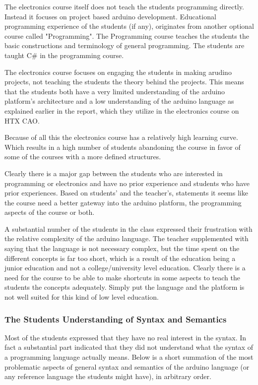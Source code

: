 The electronics course itself does not teach the students programming directly. 
Instead it focuses on project based arduino development. 
Educational programming experience of the students (if any), originates from another optional course called "Programming". 
The Programming course teaches the students the basic constructions and terminology of general programming. The students are taught C{\#} in the programming course. 

The electronics course focuses on engaging the students in making arudino projects, not teaching the students the theory behind the projects. 
This means that the students both have a very limited understanding of the arduino platform's architecture and a low understanding of the arduino language as explained earlier in the report, which they utilize in the electronics course on HTX CAO.

Because of all this the electronics course has a relatively high learning curve. 
Which results in a high number of students abandoning the course in favor of some of the courses with a more defined structures.

Clearly there is a major gap between the students who are interested in programming or electronics and have no prior experience and students who have prior experiences. 
Based on students' and the teacher's, statements it seems like the course need a better gateway into the arduino platform, the programming aspects of the course or both.

A substantial number of the students in the class expressed their frustration with the relative complexity of the arduino language. 
The teacher supplemented with saying that the language is not necessary complex, but the time spent on the different concepts is far too short, which is a result of the education being a junior education and not a college/university level education.
Clearly there is a need for the course to be able to make shortcuts in some aspects to teach the students the concepts adequately. 
Simply put the language and the platform is not well suited for this kind of low level education.

\subsubsection{The Students Understanding of Syntax and Semantics}
Most of the students expressed that they have no real interest in the syntax. 
In fact a substantial part indicated that they did not understand what the syntax of a programming language actually means. 
Below is a short summation of the most problematic aspects of general syntax and semantics of the arduino language (or any reference language the students might have), in arbitrary order.


